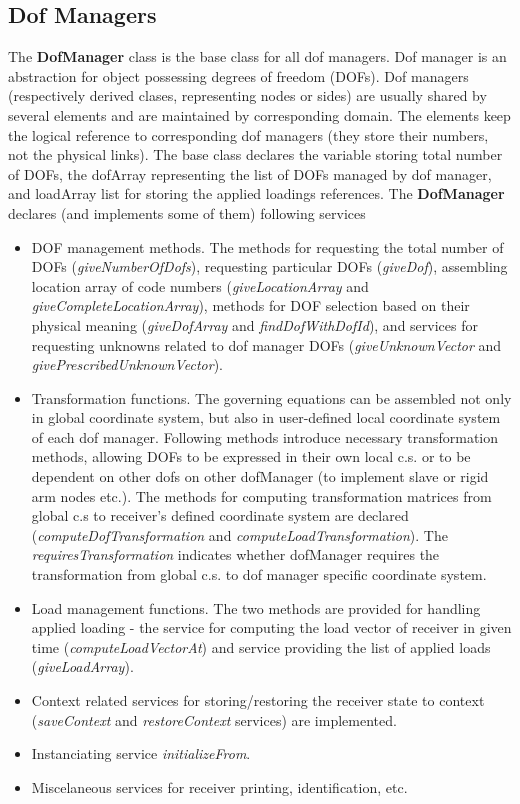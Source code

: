 \documentclass[a4paper]{article}
\newcommand{\class}[1]{{\bf #1}}
\newcommand{\service}[1]{{\em #1}}
\newcommand{\attribute}[1]{#1}
\begin{document}
\subsection{Dof Managers}
The \class{DofManager} class is the base class for all dof
managers. Dof manager is an abstraction for object possessing degrees
of freedom (DOFs). Dof managers (respectively derived clases,
representing nodes or sides) are usually shared by several elements
and are maintained by corresponding domain. The elements keep the
logical reference to corresponding dof managers (they store their
numbers, not the physical links). 
The base class declares the variable storing total number of DOFs, 
the \attribute{dofArray} representing the list of DOFs managed by dof
manager, and \attribute{loadArray} list for storing the applied
loadings references.
The \class{DofManager} declares (and implements some of them)
following services
\begin{itemize}
\item
DOF management methods. The methods for requesting the total number of
DOFs (\service{giveNumberOfDofs}), requesting particular DOFs
(\service{giveDof}), assembling location array of code numbers
(\service{giveLocationArray} and \service{giveCompleteLocationArray}),
methods for DOF selection based on their physical meaning
(\service{giveDofArray} and \service{findDofWithDofId}), and services
for requesting unknowns related to dof manager DOFs
(\service{giveUnknownVector} and \service{givePrescribedUnknownVector}).
\item
Transformation functions. 
The governing equations can be assembled not only in global coordinate system, but
also in user-defined local coordinate system of each dof
manager. Following methods introduce necessary transformation methods, 
allowing DOFs to be expressed in their own local c.s. or to be
dependent on other dofs on other dofManager (to implement 
slave or rigid arm nodes etc.). 
The methods for computing transformation matrices from global c.s to
receiver's defined coordinate system are declared
(\service{computeDofTransformation} and
\service{computeLoadTransformation}).
The \service{requiresTransformation} indicates whether dofManager requires the transformation from global c.s. to 
dof manager specific coordinate system.	
\item
Load management functions. The two methods are provided for handling
applied loading - the service for computing the load vector of
receiver in given time (\service{computeLoadVectorAt}) and service
providing the list of applied loads (\service{giveLoadArray}).
\item
Context related services for storing/restoring the receiver state to
context (\service{saveContext} and \service{restoreContext} services)
are implemented.
\item
Instanciating service \service{initializeFrom}.
\item
Miscelaneous services for receiver printing, identification, etc.
\end{itemize}
\end{document}
